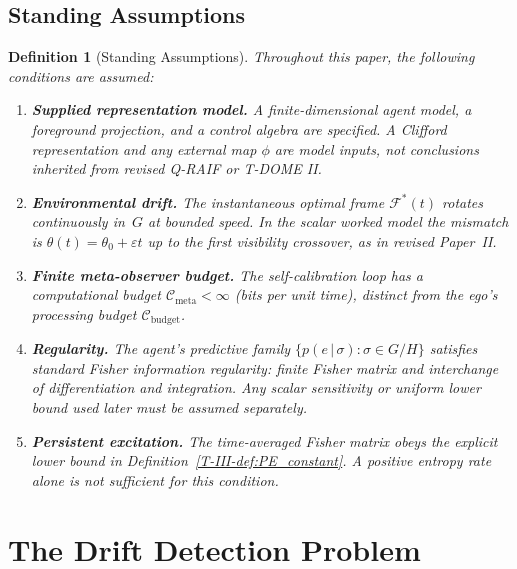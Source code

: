 \documentclass[12pt,a4paper,openany]{book}
\newtheorem{definition}[theorem]{Definition}
\begin{document}
\subsection{Standing Assumptions}
\label{T-III-subsec:standing_C}

\begin{definition}[Standing Assumptions]
\label{T-III-def:assumptions_C}
Throughout this paper, the following conditions are assumed:
\begin{enumerate}
\item[\textup{(C1)}] \textbf{Supplied representation model.}
  A finite-dimensional agent model, a foreground projection, and a
  control algebra are specified.  A Clifford representation and any
  external map $\phi$ are model inputs, not conclusions inherited from
  revised Q-RAIF or T-DOME II.
\item[\textup{(C2)}] \textbf{Environmental drift.}
  The instantaneous optimal frame
  $\mathcal{F}^*(t)$ rotates continuously in~$G$ at
  bounded speed.  In the scalar worked model the mismatch is
  $\theta(t)=\theta_0+\varepsilon t$ up to the first visibility
  crossover, as in revised Paper~II.
\item[\textup{(C3)}] \textbf{Finite meta-observer budget.}
  The self-calibration loop has a computational budget
  $\mathcal{C}_{\mathrm{meta}} < \infty$ (bits per unit
  time), distinct from the ego's processing budget
  $\mathcal{C}_{\mathrm{budget}}$.
\item[\textup{(C4)}] \textbf{Regularity.}
  The agent's predictive family
  $\{p(e\,|\,\sigma)
  : \sigma \in G/H\}$ satisfies standard Fisher
  information regularity: finite Fisher matrix and interchange of
  differentiation and integration.  Any scalar sensitivity or uniform
  lower bound used later must be assumed separately.
\item[\textup{(C5)}] \textbf{Persistent excitation.}
  The time-averaged Fisher matrix obeys the explicit lower bound in
  Definition~\ref{T-III-def:PE_constant}.  A positive entropy rate alone is
  not sufficient for this condition.
\end{enumerate}
\end{definition}

\section{The Drift Detection Problem}
\label{T-III-sec:detection}
\end{document}
